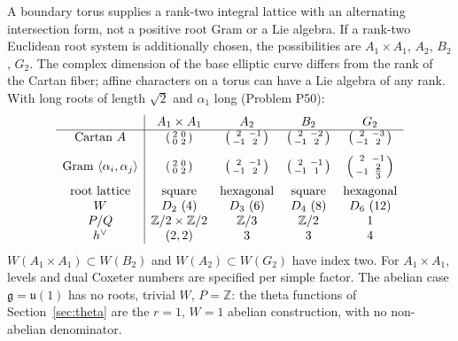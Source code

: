 \documentclass[11pt]{article}
\theoremstyle{definition}
\theoremstyle{remark}
\newcommand{\Z}{\mathbb{Z}}
\begin{document}
A boundary torus supplies a rank-two integral lattice with an alternating
intersection form, not a positive root Gram or a Lie algebra. If a rank-two
Euclidean root system is additionally chosen, the possibilities are
$A_1\times A_1$, $A_2$, $B_2$, $G_2$. The complex dimension of the base
elliptic curve differs from the rank of the Cartan fiber; affine characters
on a torus can have a Lie algebra of any rank. With long roots of length $\sqrt2$
and $\alpha_1$ long (Problem P50):
\[
\begin{array}{c|cccc}
 & A_1\times A_1 & A_2 & B_2 & G_2\\ \hline
\text{Cartan } A & \begin{psmallmatrix}2&0\\0&2\end{psmallmatrix} & \begin{psmallmatrix}2&-1\\-1&2\end{psmallmatrix}
  & \begin{psmallmatrix}2&-2\\-1&2\end{psmallmatrix} & \begin{psmallmatrix}2&-3\\-1&2\end{psmallmatrix}\\[8pt]
\text{Gram }\langle\alpha_i,\alpha_j\rangle & \begin{psmallmatrix}2&0\\0&2\end{psmallmatrix} & \begin{psmallmatrix}2&-1\\-1&2\end{psmallmatrix}
  & \begin{psmallmatrix}2&-1\\-1&1\end{psmallmatrix} & \begin{psmallmatrix}2&-1\\-1&\tfrac23\end{psmallmatrix}\\[8pt]
\text{root lattice} & \text{square} & \text{hexagonal} & \text{square} & \text{hexagonal}\\
W & D_2\ (4) & D_3\ (6) & D_4\ (8) & D_6\ (12)\\
P/Q & \Z/2\times\Z/2 & \Z/3 & \Z/2 & 1\\
h^\vee & (2,2) & 3 & 3 & 4
\end{array}
\]
$W(A_1\times A_1)\subset W(B_2)$ and $W(A_2)\subset W(G_2)$ have index two.
For $A_1\times A_1$, levels and dual Coxeter numbers are specified per
simple factor. The abelian case
$\mathfrak g = \mathfrak u(1)$ has no roots, trivial $W$, $P = \Z$: the
theta functions of Section~\ref{sec:theta} are the $r = 1$, $W = 1$
abelian construction, with no non-abelian denominator.
\end{document}
